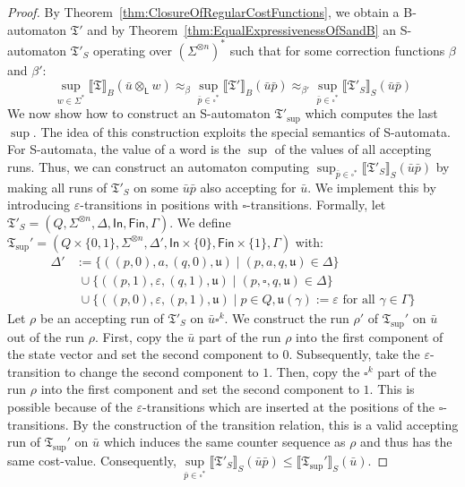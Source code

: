 \documentclass{LMCS}
\newcommand{\eps}{\varepsilon}
\newcommand{\pad}{\square}
\newcommand{\automatonT}{\mathfrak T}
\newcommand{\In}{\mathsf{In}}
\newcommand{\Fin}{\mathsf{Fin}}
\newcommand{\semantics}[1]{\llbracket#1\rrbracket}
\newcommand{\costEquiv}[1][\alpha]{\approx_{#1}}
\newcommand{\padprodL}{\otimes_{\mathsf{L}}}
\newcommand{\alphVector}[2]{#1^{\otimes #2}}
\newcommand{\alphVectorS}[2]{\left(#1^{\otimes #2}\right)^*}
\newcommand{\fraku}{\mathfrak u}
\begin{document}
\begin{proof}
By Theorem~\ref{thm:ClosureOfRegularCostFunctions}, we obtain a
B-automaton $\automatonT'$ and by Theorem~\ref{thm:EqualExpressivenessOfSandB}
an S-automaton $\automatonT'_S$ operating over $\alphVectorS{\Sigma}{n}$ such
that for some correction functions $\beta$ and $\beta'$:
\[
 \sup_{w \in \Sigma^*} \semantics{\automatonT}_B(\bar u \padprodL w)
 \costEquiv[\beta] 
   \sup_{\bar p \in \pad^*} \semantics{\automatonT'}_B(\bar u  \bar p)
 \costEquiv[\beta'] 
  \sup_{\bar p \in \pad^*} \semantics{\automatonT'_S}_S(\bar u \bar p)
\]
We now show how to construct an S-automaton $\automatonT'_{\sup}$ which computes
the last $\sup$. The idea of this construction exploits the special semantics
of S-automata. For S-automata, the value of a word is the $\sup$ of the values
of all accepting runs. Thus, we can construct an automaton computing $\sup_{\bar
p \in \pad^*} \semantics{\automatonT'_S}_S(\bar u \bar p)$ by making all runs of
$\automatonT'_S$ on some $\bar u \bar p$ also accepting for $\bar u$. We
implement this by introducing $\eps$-transitions in positions with
$\pad$-transitions.  Formally, let $\automatonT'_S =
(Q,\alphVector{\Sigma}{n},\Delta,\In,\Fin,\Gamma)$. We define
$\automatonT_{\sup}' = (Q \times \{0,1\}, \alphVector{\Sigma}{n}, \Delta', 
\In \times \{0\}, \Fin \times \{1\},\Gamma)$ with:
	\begin{align*}
	  \Delta' &:= \{ ((p,0),a,(q,0),\fraku) \mid (p,a,q,\fraku) \in \Delta \} \\
			  &\;\cup \{ ((p,1),\eps,(q,1),\fraku) \mid (p,\pad,q,\fraku) \in
              \Delta\} \\
			  &\;\cup \{ ((p,0),\eps,(p,1),\fraku) \mid p \in Q, \fraku(\gamma) := \eps \text{ for all } \gamma \in \Gamma\}
	\end{align*}
	Let $\rho$ be an accepting run of $\automatonT'_S$ on $\bar u \pad^k$.
We construct the run $\rho'$ of $\automatonT_{\sup}'$ on $\bar u$ out of the run
$\rho$. First, copy the $\bar u$ part of the run $\rho$ into the first
component of the state vector and set the second component to $0$. Subsequently,
take the $\eps$-transition to change the second component to $1$. Then, copy the
$\pad^k$ part of the run $\rho$ into the first component and set the second
component to $1$. This is possible because of the $\eps$-transitions which are
inserted at the positions of the $\pad$-transitions. By the construction of the
transition relation, this is a valid accepting run of $\automatonT_{\sup}'$ on
$\bar u$ which induces the same counter sequence as $\rho$ and thus has the
same cost-value. Consequently, $\sup\limits_{\bar p \in \pad^*}
\semantics{\automatonT'_S}_S(\bar u \bar p) \le
\semantics{\automatonT_{\sup}'}_S(\bar u)$.


\end{proof}
\end{document}
